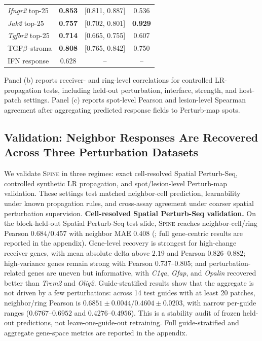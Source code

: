 \documentclass[sigconf,review,balance=false]{acmart}
\newcommand{\methodname}{\textsc{Spine}\xspace}
\begin{document}
\begin{table}[t]
\begin{minipage}[t]{0.38\linewidth}
{\begin{tabular}{@{}lccc@{}}
\midrule
\textit{Ifngr2} top-25 & \textbf{0.853} & [0.811, 0.887] & 0.536 \\
\textit{Jak2} top-25   & \textbf{0.757} & [0.702, 0.801] & \textbf{0.929} \\
\textit{Tgfbr2} top-25 & \textbf{0.714} & [0.665, 0.755] & 0.607 \\
TGF$\beta$--stroma     & \textbf{0.808} & [0.765, 0.842] & 0.750 \\
IFN response            & 0.628 & -- & -- \\
\bottomrule
\end{tabular}
}
\vspace{3pt}
\parbox{\linewidth}{\scriptsize
Panel (b) reports receiver- and ring-level correlations for controlled LR-propagation tests, including held-out perturbation, interface, strength, and host-patch settings. Panel (c) reports spot-level Pearson and lesion-level Spearman agreement after aggregating predicted response fields to Perturb-map spots.}
\end{minipage}
\vspace{-2pt}
\end{table}




\subsection{Validation: Neighbor Responses Are Recovered Across Three Perturbation Datasets}
\label{sec:validation_main_benchmark}
We validate \methodname{} in three regimes: exact cell-resolved Spatial Perturb-Seq, controlled synthetic LR propagation, and spot/lesion-level Perturb-map validation. These settings test matched neighbor-cell prediction, learnability under known propagation rules, and cross-assay agreement under coarser spatial perturbation supervision.
\textbf{Cell-resolved Spatial Perturb-Seq validation.}
On the block-held-out Spatial Perturb-Seq test slide, \methodname{} reaches
neighbor-cell/ring Pearson $0.684/0.457$ with neighbor MAE $0.408$
(; full gene-centric results are reported in the appendix). Gene-level recovery is strongest for
high-change receiver genes, with mean absolute delta above $2.19$ and Pearson
$0.826$--$0.882$; high-variance genes remain strong with Pearson
$0.737$--$0.805$; and perturbation-related genes are uneven but informative, with
\textit{C1qa}, \textit{Gfap}, and \textit{Opalin} recovered better than
\textit{Trem2} and \textit{Olig2}. Guide-stratified results show that the
aggregate is not driven by a few perturbations: across 14 test guides with at
least 20 patches, neighbor/ring Pearson is
$0.6851 \pm 0.0044$/$0.4604 \pm 0.0203$, with narrow per-guide ranges
($0.6767$--$0.6952$ and $0.4276$--$0.4956$). This is a stability audit of frozen
held-out predictions, not leave-one-guide-out retraining. Full guide-stratified
and aggregate gene-space metrics are reported in the appendix.
\end{document}
